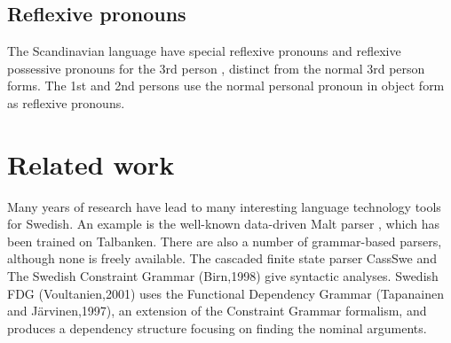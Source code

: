 \documentclass{report}
\begin{document}
\subsection{Reflexive pronouns}
\label{swe:refl}
The Scandinavian language have special reflexive pronouns
and reflexive possessive pronouns for the 3rd
person \cite[ \& 319]{H&H}, distinct from the normal 3rd person forms.
The 1st and 2nd persons use the normal personal pronoun in object form as reflexive
pronouns.



\section{Related work}
\label{sec:related}
Many years of research have lead to many interesting language
technology tools for Swedish.
An example is the well-known data-driven Malt parser \cite{malt},
which has been trained on Talbanken. 
There are also a number of grammar-based parsers, although none is freely available.
The cascaded finite state parser CassSwe \cite{casswe} and
The Swedish Constraint Grammar (Birn,1998) 
give syntactic analyses. %
Swedish FDG (Voultanien,2001) uses the Functional Dependency Grammar
(Tapanainen and Järvinen,1997), an extension of the Constraint Grammar
formalism, and produces a dependency structure focusing on finding the nominal
arguments. \\
\end{document}
